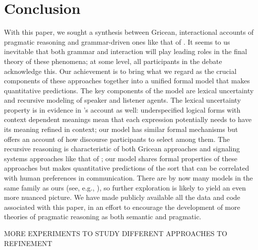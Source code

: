 \documentclass[leqno]{article}
\begin{document}

\section{Conclusion}\label{sec:conclusion}

With this paper, we sought a synthesis between Gricean, interactional
accounts of pragmatic reasoning and grammar-driven ones like that of
\citet{ChierchiaFoxSpector08}. It seems to us inevitable that both
grammar and interaction will play leading roles in the final theory of
these phenomena; at some level, all participants in the debate
acknowledge this. Our achievement is to bring what we regard as the
crucial components of these approaches together into a unified formal
model that makes quantitative predictions. The key components of the
model are lexical uncertainty and recursive modeling of speaker and
listener agents. The lexical uncertainty property is in evidence in
\citeauthor{ChierchiaFoxSpector08}'s account as well: underspecified
logical forms with context dependent meanings mean that each
expression potentially needs to have its meaning refined in context;
our model has similar formal mechanisms but offers an account of how
discourse participants to select among them.  The recursive reasoning
is characteristic of both Gricean approaches and signaling systems
approaches like that of \citet{Lewis69}; our model shares formal
properties of these approaches but makes quantitative predictions of
the sort that can be correlated with human preferences in
communication. There are by now many models in the same family as ours
(see, e.g.,
\citealt{CamererHo:2004,Jaeger:2011,Smith:Goodman:Frank:2013,Kao-etal:2014}),
so further exploration is likely to yield an even more nuanced
picture. We have made publicly available all the data and code
associated with this paper, in an effort to encourage the development
of more theories of pragmatic reasoning as both semantic and
pragmatic.

MORE EXPERIMENTS TO STUDY DIFFERENT APPROACHES TO REFINEMENT




\end{document}
